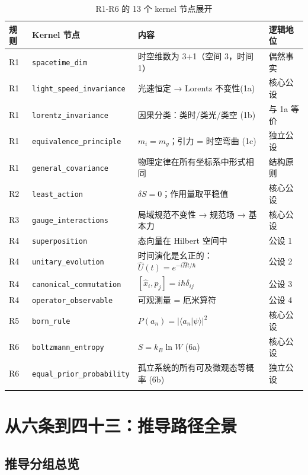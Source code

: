 \begin{center}
\footnotesize
\begin{longtable}{p{1cm}p{2.5cm}p{5cm}p{5.5cm}}
\toprule
\textbf{规则} & \textbf{Kernel 节点} & \textbf{内容} & \textbf{逻辑地位} \\
\midrule
R1 & \texttt{spacetime\_dim} & 时空维数为 3+1（空间 3，时间 1）& 偶然事实 \\
R1 & \texttt{light\_speed\_invariance} & 光速恒定 → Lorentz 不变性(1a) & 核心公设 \\
R1 & \texttt{lorentz\_invariance} & 因果分类：类时/类光/类空 (1b) & 与 1a 等价 \\
R1 & \texttt{equivalence\_principle} & $m_i = m_g$；引力 = 时空弯曲 (1c) & 独立公设 \\
R1 & \texttt{general\_covariance} & 物理定律在所有坐标系中形式相同 & 结构原则 \\
\midrule
R2 & \texttt{least\_action} & $\delta S = 0$；作用量取平稳值 & 核心公设 \\
\midrule
R3 & \texttt{gauge\_interactions} & 局域规范不变性 → 规范场 → 基本力 & 核心公设 \\
\midrule
R4 & \texttt{superposition} & 态向量在 Hilbert 空间中 & 公设 1 \\
R4 & \texttt{unitary\_evolution} & 时间演化是幺正的：$\hat{U}(t) = e^{-i\hat{H}t/\hbar}$ & 公设 2 \\
R4 & \texttt{canonical\_commutation} & $[\hat{x}_i,\hat{p}_j] = i\hbar\delta_{ij}$ & 公设 3 \\
R4 & \texttt{operator\_observable} & 可观测量 = 厄米算符 & 公设 4 \\
\midrule
R5 & \texttt{born\_rule} & $P(a_n) = |\langle a_n|\psi\rangle|^2$ & 核心公设 \\
\midrule
R6 & \texttt{boltzmann\_entropy} & $S = k_B\ln W$ (6a) & 核心公设 \\
R6 & \texttt{equal\_prior\_probability} & 孤立系统的所有可及微观态等概率 (6b) & 独立公设 \\
\bottomrule
\caption{R1-R6 的 13 个 kernel 节点展开}
\end{longtable}
\end{center}

\section{从六条到四十三：推导路径全景}

\subsection{推导分组总览}

